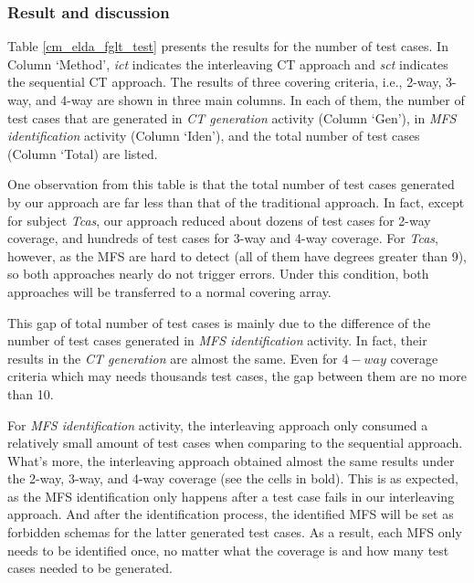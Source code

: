 \documentclass{sig-alternate}
\begin{document}




\subsubsection{Result and discussion}
Table \ref{cm_elda_fglt_test} presents the results for the number of test cases. In Column `Method', \emph{ict} indicates the interleaving CT approach and \emph{sct} indicates the sequential CT approach. The results of three covering criteria, i.e., 2-way, 3-way, and 4-way are shown in three main columns. In each of them, the number of test cases that are generated in \emph{CT generation} activity (Column `Gen'), in \emph{MFS identification} activity (Column `Iden'), and the total number of test cases (Column `Total) are listed.

One observation from this table is that the total number of test cases generated by our approach are far less than that of the traditional approach. In fact, except for subject \emph{Tcas}, our approach reduced about dozens of test cases for 2-way coverage, and hundreds of test cases for 3-way and 4-way coverage. For \emph{Tcas}, however, as the MFS are hard to detect (all of them have degrees greater than 9), so both approaches nearly do not trigger errors. Under this condition, both approaches will be transferred to a normal covering array.

This gap of total number of test cases is mainly due to the difference of the number of test cases generated in \emph{MFS identification} activity. In fact, their results in the \emph{CT generation} are almost the same. Even for $4-way$ coverage criteria which may needs thousands test cases, the gap between them are no more than 10.

For \emph{MFS identification} activity, the interleaving approach only consumed a relatively small amount of test cases when comparing to the sequential approach. What's more, the interleaving approach obtained almost the same results under the 2-way, 3-way, and 4-way coverage (see the cells in bold). This is as expected, as the MFS identification only happens after a test case fails in our interleaving approach. And after the identification process, the identified MFS will be set as forbidden schemas for the latter generated test cases. As a result, each MFS only needs to be identified once, no matter what the coverage is and how many test cases needed to be generated.
\end{document}
